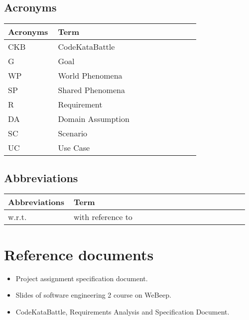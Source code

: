     \subsection{Acronyms}
    \begin{center}
	\begin{tabular}{@{}p{0.25\linewidth} p{0.71\linewidth}@{}}
		\toprule
		\textbf{Acronyms} & \textbf{Term}\\
		\midrule
		CKB & CodeKataBattle\\
            G & Goal\\
		WP & World Phenomena\\
		SP & Shared Phenomena\\
            R & Requirement\\
            DA & Domain Assumption\\
            SC & Scenario\\
            UC & Use Case\\
		\bottomrule
	\end{tabular}
    \end{center}

    \subsection{Abbreviations}
    \begin{center}
	\begin{tabular}{@{}p{0.25\linewidth} p{0.71\linewidth}@{}}
		\toprule
		\textbf{Abbreviations} & \textbf{Term}\\
		\midrule
		w.r.t. & with reference to\\
		\bottomrule
	\end{tabular}
    \end{center}
    
\section{Reference documents}
\begin{itemize}
	\item Project assignment specification document.
	\item Slides of software engineering 2 course on WeBeep.
        \item CodeKataBattle, Requirements Analysis and Specification Document. 
\end{itemize}

